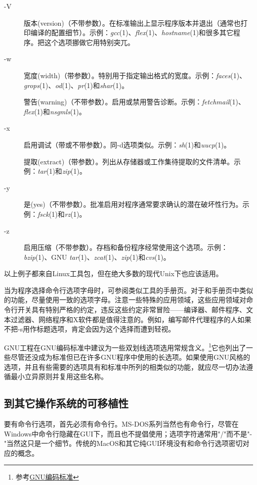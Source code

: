 \documentclass[12pt,oneside]{book}
\begin{document}
\begin{common-format}
\begin{description}
\item[-V] 版本(version)（不带参数）。在标准输出上显示程序版本并退出（通常也打印编译的配置细节）。示例：\textit{gcc}(1)、\textit{flex}(1)、\textit{hostname}(1)和很多其它程序。把这个选项挪做它用特别突兀。

\item[-w] 宽度(width)（带参数）。特别用于指定输出格式的宽度。示例：\textit{faces}(1)、\textit{grops}(1)、\textit{od}(1)、\textit{pr}(1)和\textit{shar}(1)。

警告(warning)（不带参数）。启用或禁用警告诊断。示例：\textit{fetchmail}(1)、\textit{flex}(1)和\textit{nsgmls}(1)。

\item[-x] 启用调试（带或不带参数）。同-d选项类似。示例：\textit{sh}(1)和\textit{uucp}(1)。
    
提取(extract)（带参数）。列出从存储器或工作集待提取的文件清单。示例：\textit{tar}(1)和\textit{zip}(1)。

\item[-y] 是(yes)（不带参数）。批准启用对程序通常要求确认的潜在破坏性行为。示例：\textit{fsck}(1)和\textit{rz}(1)。

\item[-z] 启用压缩（不带参数）。存档和备份程序经常使用这个选项。示例：\textit{bzip}(1)、GNU \textit{tar}(1)、\textit{zcat}(1)、\textit{zip}(1)和\textit{cvs}(1)。
\end{description}

以上例子都来自Linux工具包，但在绝大多数的现代Unix下也应该适用。

当为程序选择命令行选项字母时，可参阅类似工具的手册页。对于和手册页中类似的功能，尽量使用一致的选项字母。注意一些特殊的应用领域，这些应用领域对命令行开关具有特别严格的约定，违反这些约定非常冒险——编译器、邮件程序、文本过滤器、网络程序和X软件都是值得注意的。例如，编写邮件代理程序的人如果不把-s用作标题选项，肯定会因为这个选择而遭到轻视。

GNU工程在GNU编码标准中建议为一些双划线选项选用常规含义。\footnote{参考\href{http://www.gnu.org/prep/standards.html}{GNU编码标准}}它也列出了一些尽管还没成为标准但已在许多GNU程序中使用的长选项。如果使用GNU风格的选项，并且有些需要的选项具有和标准中所列的相类似的功能，就应尽一切办法遵循最小立异原则并复用这些名称。

\subsection{到其它操作系统的可移植性}
要有命令行选项，首先必须有命令行。MS-DOS系列当然也有命令行，尽管在Windows中命令行隐藏在GUI下，而且也不提倡使用；选项字符通常用"/"而不是"-"当然这只是一个细节。传统的MacOS和其它纯GUI环境没有和命令行选项密切对应的概念。



\end{common-format}
\end{document}
